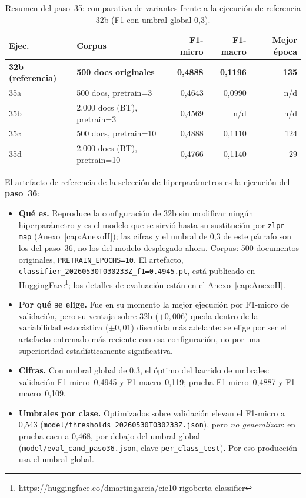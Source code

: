 \begin{table}[h]
\centering
\small
\caption{Resumen del paso~35: comparativa de variantes frente a la ejecución de referencia 32b (F1 con umbral global 0,3).}
\label{tab:paso35}
\begin{tabular}{llrrr}
\hline
\textbf{Ejec.} & \textbf{Corpus} & \textbf{F1-micro} & \textbf{F1-macro} & \textbf{Mejor época} \\
\hline
\textbf{32b (referencia)} & \textbf{500 docs originales} & \textbf{0,4888} & \textbf{0,1196} & \textbf{135} \\
35a & 500 docs, pretrain=3 & 0,4643 & 0,0990 & n/d \\
35b & 2.000 docs (BT), pretrain=3 & 0,4569 & n/d & n/d \\
35c & 500 docs, pretrain=10 & 0,4888 & 0,1110 & 124 \\
35d & 2.000 docs (BT), pretrain=10 & 0,4766 & 0,1140 & 29 \\
\hline
\end{tabular}
\end{table}

El artefacto de referencia de la selección de hiperparámetros es la ejecución del \textbf{paso~36}:

\begin{itemize}
 \item \textbf{Qué es.} Reproduce la configuración de 32b sin modificar ningún hiperparámetro y es el modelo que se sirvió hasta su sustitución por \texttt{zlpr-map} (Anexo~\ref{cap:AnexoH}); las cifras y el umbral de 0,3 de este párrafo son los del paso~36, no los del modelo desplegado ahora. Corpus: 500 documentos originales, \texttt{PRETRAIN\_EPOCHS=10}. El artefacto, \texttt{classifier\_20260530T030233Z\_f1=0.4945.pt}, está publicado en HuggingFace\footnote{\url{https://huggingface.co/dmartingarcia/cie10-rigoberta-classifier}}; los detalles de evaluación están en el Anexo~\ref{cap:AnexoH}.
 \item \textbf{Por qué se elige.} Fue en su momento la mejor ejecución por F1-micro de validación, pero su ventaja sobre 32b ($+0{,}006$) queda dentro de la variabilidad estocástica ($\pm 0{,}01$) discutida más adelante: se elige por ser el artefacto entrenado más reciente con esa configuración, no por una superioridad estadísticamente significativa.
 \item \textbf{Cifras.} Con umbral global de 0,3, el óptimo del barrido de umbrales: validación F1-micro~0,4945 y F1-macro~0,119; prueba F1-micro~0,4887 y F1-macro~0,109.
 \item \textbf{Umbrales por clase.} Optimizados sobre validación elevan el F1-micro a 0,543 (\texttt{model/\allowbreak thresholds\_20260530T030233Z.json}), pero \emph{no generalizan}: en prueba caen a 0,468, por debajo del umbral global (\texttt{model/\allowbreak eval\_cand\_paso36.json}, clave \texttt{per\_class\_test}). Por eso producción usa el umbral global.
\end{itemize}

